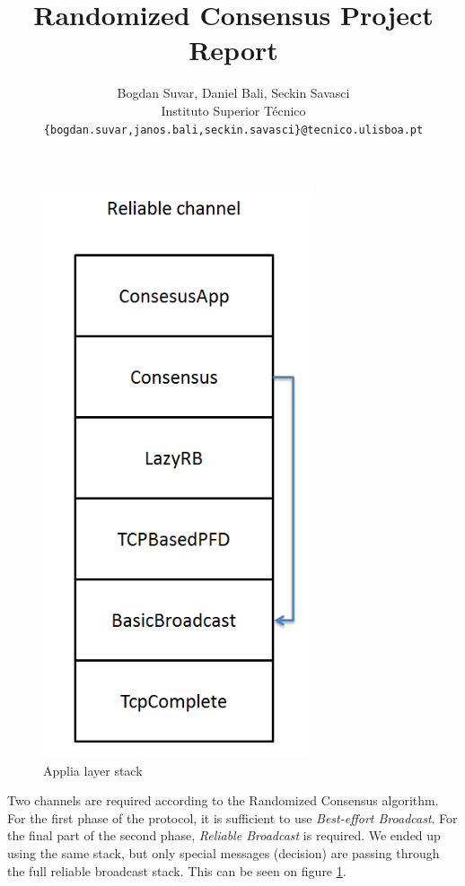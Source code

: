 \documentclass[times, 12pt,twocolumn]{article}
\begin{document}
\title{Randomized Consensus Project Report}

\author{Bogdan Suvar, Daniel Bali, Seckin Savasci\\
Instituto Superior T\'{e}cnico\\
\texttt{\{bogdan.suvar,janos.bali,seckin.savasci\}@tecnico.ulisboa.pt}\\
}
 
\maketitle
\thispagestyle{empty}




\begin{figure}[ht!]
\centering
\includegraphics[width=80mm]{stack.png}
\caption{Applia layer stack}
\label{fig:stack}
\end{figure}

Two channels are required according to the Randomized Consensus algorithm. 
For the first phase of the protocol, it is sufficient to use 
\textit{Best-effort Broadcast}. For the final part of the second phase, 
\textit{Reliable Broadcast} is required. We ended up using the same stack, 
but only special messages (decision) are passing through the full reliable 
broadcast stack. This can be seen on figure \ref{fig:stack}.
\end{document}
